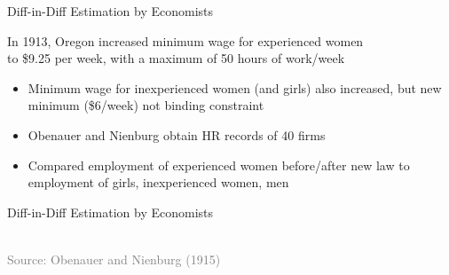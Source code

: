 \documentclass[10pt,xcolor=table,ignorenonframetext,handout,aspectratio=169]{beamer}
\newlength{\wideitemsep}
\let\olditem\item
\renewcommand{\item}{\setlength{\itemsep}{\wideitemsep}\olditem}
\begin{document}

\begin{frame}{Diff-in-Diff Estimation by Economists}

\medskip
\medskip
In 1913, Oregon increased minimum wage for experienced women \\
to \$9.25 per week, with a maximum of 50 hours of work/week

\medskip
\begin{itemize}
	
	\item Minimum wage for inexperienced women (and girls) also increased, but new minimum (\$6/week) not binding constraint
	
	\item Obenauer and Nienburg obtain HR records of 40 firms 
	
	\item Compared employment of experienced women before/after new law to employment of girls, inexperienced women, men
	
\end{itemize}

\end{frame}



\begin{frame}{Diff-in-Diff Estimation by Economists}

\medskip
\begin{center}
	 \\
	\textcolor{gray}{\tiny{Source: Obenauer and Nienburg (1915)}}
\end{center}

\end{frame}
\end{document}
